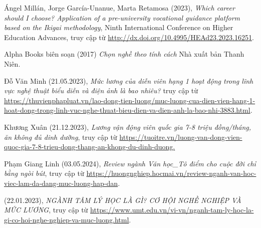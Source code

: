 \begin{thebibliography}{99}
    Ángel Millán, Jorge García-Unanue, Marta Retamosa (2023),
    \emph{Which career should I choose? Application of a pre-university vocational guidance platform based on the Ikigai methodology},
     Ninth International Conference on Higher Education Advances,
    truy cập từ \href{http://dx.doi.org/10.4995/HEAd23.2023.16251}{\color{black}http://dx.doi.org/10.4995/HEAd23.2023.16251}.

    Alpha Books biên soạn (2017)
    \emph{Chọn nghề theo tính cách}
    Nhà xuất bản Thanh Niên.

    Đỗ Văn Minh (21.05.2023),
    \emph{Mức lương của diễn viên hạng 1 hoạt động trong lĩnh vực nghệ thuật biểu diễn và điện ảnh là bao nhiêu?}
    truy cập từ \href{https://thuvienphapluat.vn/lao-dong-tien-luong/muc-luong-cua-dien-vien-hang-1-hoat-dong-trong-linh-vuc-nghe-thuat-bieu-dien-va-dien-anh-la-bao-nhi-3883.html}{\color{black}https://thuvienphapluat.vn/lao-dong-tien-luong/muc-luong-cua-dien-vien-hang-1-hoat-dong-trong-linh-vuc-nghe-thuat-bieu-dien-va-dien-anh-la-bao-nhi-3883.html}.

    Khương Xuân (21.12.2023),
    \emph{Lương vận động viên quốc gia 7-8 triệu đồng/tháng, ăn không đủ dinh dưỡng},
    truy cập từ \href{https://tuoitre.vn/luong-van-dong-vien-quoc-gia-7-8-trieu-dong-thang-an-khong-du-dinh-duong-20231221114836483.htm#:~:text=Theo%20ngh%E1%BB%8B%20%C4%91%E1%BB%8Bnh%20152%20quy,tri%E1%BB%87u%20%C4%91%E1%BB%93ng%2Fng%C6%B0%E1%BB%9Di%2Fth%C3%A1ng.}{\color{black}https://tuoitre.vn/luong-van-dong-vien-quoc-gia-7-8-trieu-dong-thang-an-khong-du-dinh-duong.}

    Phạm Giang Linh (03.05.2024),
    \emph{Review ngành Văn học\_Tô điểm cho cuộc đời chỉ bằng ngòi bút},
    truy cập từ \href{https://huongnghiep.hocmai.vn/review-nganh-van-hoc-viec-lam-da-dang-muc-luong-hap-dan/#:~:text=Hi%E1%BB%87n%20nay%20m%E1%BB%A9c%20l%C6%B0%C6%A1ng%20c%E1%BB%A7a,ph%C3%A1t%20tri%E1%BB%83n%20chuy%C3%AAn%20s%C3%A2u%20h%C6%A1n}{\color{black}https://huongnghiep.hocmai.vn/review-nganh-van-hoc-viec-lam-da-dang-muc-luong-hap-dan}.
    
    (22.01.2023), 
    \emph{NGÀNH TÂM LÝ HỌC LÀ GÌ? CƠ HỘI NGHỀ NGHIỆP VÀ MỨC LƯƠNG},
    truy cập từ \href{https://www.umt.edu.vn/vi-vn/nganh-tam-ly-hoc-la-gi-co-hoi-nghe-nghiep-va-muc-luong.html}{\color{black}https://www.umt.edu.vn/vi-vn/nganh-tam-ly-hoc-la-gi-co-hoi-nghe-nghiep-va-muc-luong.html}.


\end{thebibliography}
